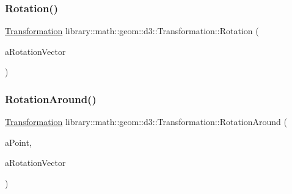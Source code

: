 \subsubsection{\texorpdfstring{Rotation()}{Rotation()}}
{\footnotesize\ttfamily \hyperlink{classlibrary_1_1math_1_1geom_1_1d3_1_1_transformation}{Transformation} library\+::math\+::geom\+::d3\+::\+Transformation\+::\+Rotation (\begin{DoxyParamCaption}\item[{const \hyperlink{classlibrary_1_1math_1_1geom_1_1trf_1_1rot_1_1_rotation_vector}{Rotation\+Vector} \&}]{a\+Rotation\+Vector }\end{DoxyParamCaption})\hspace{0.3cm}{\ttfamily [static]}}

\mbox{\label{classlibrary_1_1math_1_1geom_1_1d3_1_1_transformation_a11d93f665adb24cc4fdf2244c8509082}} 
\subsubsection{\texorpdfstring{Rotation\+Around()}{RotationAround()}}
{\footnotesize\ttfamily \hyperlink{classlibrary_1_1math_1_1geom_1_1d3_1_1_transformation}{Transformation} library\+::math\+::geom\+::d3\+::\+Transformation\+::\+Rotation\+Around (\begin{DoxyParamCaption}\item[{const \hyperlink{classlibrary_1_1math_1_1geom_1_1d3_1_1objects_1_1_point}{Point} \&}]{a\+Point,  }\item[{const \hyperlink{classlibrary_1_1math_1_1geom_1_1trf_1_1rot_1_1_rotation_vector}{Rotation\+Vector} \&}]{a\+Rotation\+Vector }\end{DoxyParamCaption})\hspace{0.3cm}{\ttfamily [static]}}

\mbox{\label{classlibrary_1_1math_1_1geom_1_1d3_1_1_transformation_a9511c7844b5b8af0c8c7ad97454a5a96}} 
